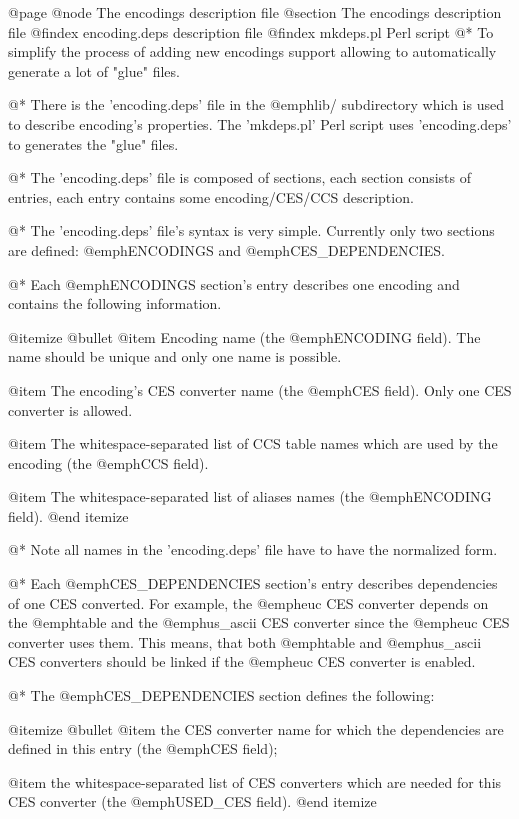 @page
@node The encodings description file
@section The encodings description file
@findex encoding.deps description file
@findex mkdeps.pl Perl script
@*
To simplify the process of adding new encodings support allowing to
automatically generate a lot of "glue" files.

@*
There is the 'encoding.deps' file in the @emph{lib/} subdirectory which
is used to describe encoding's properties. The 'mkdeps.pl' Perl script
uses 'encoding.deps' to generates the "glue" files.

@*
The 'encoding.deps' file is composed of sections, each section consists
of entries, each entry contains some encoding/CES/CCS description. 

@*
The 'encoding.deps' file's syntax is very simple. Currently only two
sections are defined: @emph{ENCODINGS} and @emph{CES_DEPENDENCIES}.

@*
Each @emph{ENCODINGS} section's entry describes one encoding and
contains the following information.

@itemize @bullet
@item
Encoding name (the @emph{ENCODING} field). The name should
be unique and only one name is possible.

@item
The encoding's CES converter name (the @emph{CES} field). Only one CES
converter is allowed.

@item
The whitespace-separated list of CCS table names which are used by the
encoding (the @emph{CCS} field).

@item
The whitespace-separated list of aliases names (the @emph{ENCODING}
field).
@end itemize

@*
Note all names in the 'encoding.deps' file have to have the normalized
form.

@*
Each @emph{CES_DEPENDENCIES} section's entry describes dependencies of
one CES converted. For example, the @emph{euc} CES converter depends on
the @emph{table} and the @emph{us_ascii} CES converter since the
@emph{euc} CES converter uses them. This means, that both @emph{table}
and @emph{us_ascii} CES converters should be linked if the @emph{euc}
CES converter is enabled.

@*
The @emph{CES_DEPENDENCIES} section defines the following:

@itemize @bullet
@item
the CES converter name for which the dependencies are defined in this
entry (the @emph{CES} field);

@item
the whitespace-separated list of CES converters which are needed for
this CES converter (the @emph{USED_CES} field).
@end itemize

